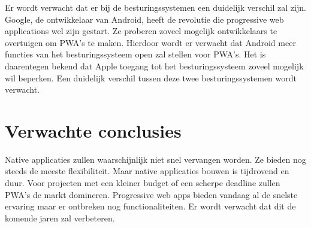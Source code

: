 Er wordt verwacht dat er bij de besturingssystemen een duidelijk verschil zal zijn. 
Google, de ontwikkelaar van Android, heeft de revolutie die progressive web applications wel zijn gestart. Ze proberen zoveel mogelijk ontwikkelaars te overtuigen om PWA’s te maken. Hierdoor wordt er verwacht dat Android meer functies van het besturingssysteem open zal stellen voor PWA’s.
Het is daarentegen bekend dat Apple toegang tot het besturingssysteem zoveel mogelijk wil beperken. Een duidelijk verschil tussen deze twee besturingssystemen wordt verwacht. 
\autocite{Hansen2017}




\section{Verwachte conclusies}
\label{sec:verwachte_conclusies}

Native applicaties zullen waarschijnlijk niet snel vervangen worden. Ze bieden nog steeds de meeste flexibiliteit. Maar native applicaties bouwen is tijdrovend en duur. 
Voor projecten met een kleiner budget of een scherpe deadline zullen PWA’s de markt domineren.
Progressive web apps bieden vandaag al de snelste ervaring maar er ontbreken nog functionaliteiten. Er wordt verwacht dat dit de komende jaren zal verbeteren.





